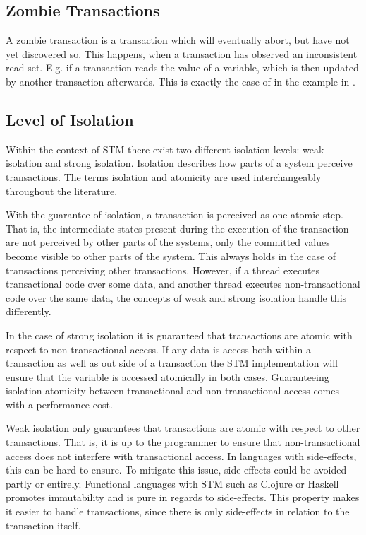 \subsection{Zombie Transactions}
\label{subsec:zombie}
A zombie transaction is a transaction which will eventually abort, but have not yet discovered so. This happens, when a transaction has observed an inconsistent read-set\cite[p. 196]{dice2006transactional}. E.g. if a transaction reads the value of a variable, which is then updated by another transaction afterwards. This is exactly the case of  in the example in .

\subsection{Level of Isolation}
\label{subsec:isolation_level}
Within the context of \ac{STM} there exist two different isolation levels: weak isolation and strong isolation. Isolation describes how parts of a system perceive transactions. The terms isolation and atomicity are used interchangeably throughout the literature\cite[p. 30]{harris2010transactional}.

With the guarantee of isolation, a transaction is perceived as one atomic step. That is, the intermediate states present during the execution of the transaction are not perceived by other parts of the systems, only the committed values become visible to other parts of the system. This always holds in the case of transactions perceiving other transactions. However, if a thread executes transactional code over some data, and another thread executes non-transactional code over the same data, the concepts of weak and strong isolation handle this differently.

In the case of strong isolation it is guaranteed that transactions are atomic with respect to non-transactional access\cite[p. 2083]{herlihy2011tm}. If any data is access both within a transaction as well as out side of a transaction the \ac{STM} implementation will ensure that the variable is accessed atomically in both cases. Guaranteeing isolation atomicity between transactional and non-transactional access comes with a performance cost\cite{herlihy2011tm}. 

Weak isolation only guarantees that transactions are atomic with respect to other transactions. That is, it is up to the programmer to ensure that non-transactional access does not interfere with transactional access. In languages with side-effects, this can be hard to ensure. To mitigate this issue, side-effects could be avoided  partly or entirely. Functional languages with \ac{STM} such as Clojure or Haskell promotes immutability and is pure in regards to side-effects. This property makes it easier to handle transactions, since there is only side-effects in relation to the transaction itself. 

